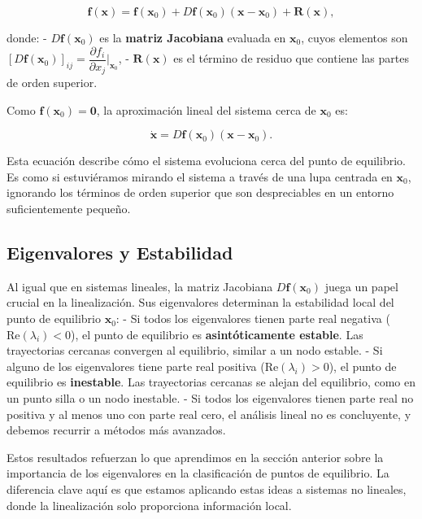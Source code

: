 \begin{equation}
    \mathbf{f}(\mathbf{x}) = \mathbf{f}(\mathbf{x}_0) + D\mathbf{f}(\mathbf{x}_0)(\mathbf{x} - \mathbf{x}_0) + \mathbf{R}(\mathbf{x}),
\end{equation}

donde:
- $D\mathbf{f}(\mathbf{x}_0)$ es la \textbf{matriz Jacobiana} evaluada en $\mathbf{x}_0$, cuyos elementos son $\left[ D\mathbf{f}(\mathbf{x}_0) \right]_{ij} = \dfrac{\partial f_i}{\partial x_j} \bigg|_{\mathbf{x}_0}$,
- $\mathbf{R}(\mathbf{x})$ es el término de residuo que contiene las partes de orden superior.

Como $\mathbf{f}(\mathbf{x}_0) = \mathbf{0}$, la aproximación lineal del sistema cerca de $\mathbf{x}_0$ es:

\begin{equation}\label{eq:sistema_linealizado}
    \dot{\mathbf{x}} = D\mathbf{f}(\mathbf{x}_0)(\mathbf{x} - \mathbf{x}_0).
\end{equation}

Esta ecuación describe cómo el sistema evoluciona cerca del punto de equilibrio. Es como si estuviéramos mirando el sistema a través de una lupa centrada en $\mathbf{x}_0$, ignorando los términos de orden superior que son despreciables en un entorno suficientemente pequeño.

\subsection{Eigenvalores y Estabilidad}

Al igual que en sistemas lineales, la matriz Jacobiana $D\mathbf{f}(\mathbf{x}_0)$ juega un papel crucial en la linealización. Sus eigenvalores determinan la estabilidad local del punto de equilibrio $\mathbf{x}_0$:
- Si todos los eigenvalores tienen parte real negativa ($\text{Re}(\lambda_i) < 0$), el punto de equilibrio es \textbf{asintóticamente estable}. Las trayectorias cercanas convergen al equilibrio, similar a un nodo estable.
- Si alguno de los eigenvalores tiene parte real positiva ($\text{Re}(\lambda_i) > 0$), el punto de equilibrio es \textbf{inestable}. Las trayectorias cercanas se alejan del equilibrio, como en un punto silla o un nodo inestable.
- Si todos los eigenvalores tienen parte real no positiva y al menos uno con parte real cero, el análisis lineal no es concluyente, y debemos recurrir a métodos más avanzados.

Estos resultados refuerzan lo que aprendimos en la sección anterior sobre la importancia de los eigenvalores en la clasificación de puntos de equilibrio. La diferencia clave aquí es que estamos aplicando estas ideas a sistemas no lineales, donde la linealización solo proporciona información local.

